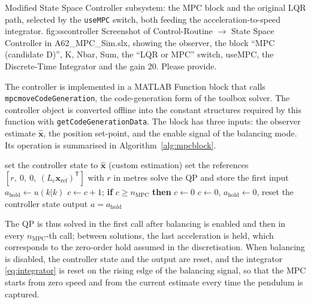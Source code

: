  {Modified State Space Controller subsystem: the \acs{MPC} block and the original \acs{LQR} path, selected by the \texttt{useMPC} switch, both feeding the acceleration-to-speed integrator.}
  {fig:sscontroller}
  {Screenshot of Control-Routine $\rightarrow$ State Space Controller in A62\_MPC\_Sim.slx, showing the observer, the block ``MPC (candidate D)'', K, Nbar, Sum, the ``LQR or MPC'' switch, useMPC, the Discrete-Time Integrator and the gain 20. Please provide.}

\begin{sloppypar}
The controller is implemented in a MATLAB Function block that calls
\texttt{mpcmoveCodeGeneration}, the code-generation form of the toolbox solver.
The controller object is converted offline into the constant structures
required by this function with \texttt{getCodeGenerationData}. The block has
three inputs: the observer estimate $\hat{\mathbf{x}}$, the position
set-point, and the enable signal of the balancing mode. Its operation is
summarised in Algorithm~\ref{alg:mpcblock}.
\end{sloppypar}

\begin{algorithm}[ht]
\caption{Execution of the \acs{MPC} block in each call of the Control-Routine.}
\label{alg:mpcblock}
\begin{algorithmic}[1]
    \STATE set the controller state to $\hat{\mathbf{x}}$ (custom estimation)
    \STATE set the references $[r,\ 0,\ 0,\ (L_c\mathbf{x}_{\mathrm{ref}})^{\mathsf{T}}]$ with $r$ in metres
    \STATE solve the \ac{QP} and store the first input $a_{\mathrm{hold}} \leftarrow u(k|k)$
  \ENDIF
  \STATE $c \leftarrow c + 1$; \textbf{if} $c \ge n_{\mathrm{MPC}}$ \textbf{then} $c \leftarrow 0$
\ELSE
  \STATE $c \leftarrow 0$, $a_{\mathrm{hold}} \leftarrow 0$, reset the controller state
\ENDIF
\STATE output $a = a_{\mathrm{hold}}$
\end{algorithmic}
\end{algorithm}

The \ac{QP} is thus solved in the first call after balancing is enabled and
then in every $n_{\mathrm{MPC}}$-th call; between solutions, the last
acceleration is held, which corresponds to the zero-order hold assumed in the
discretisation. When balancing is disabled, the controller state and the
output are reset, and the integrator \eqref{eq:integrator} is reset on the
rising edge of the balancing signal, so that the \ac{MPC} starts from zero
speed and from the current estimate every time the pendulum is captured.

